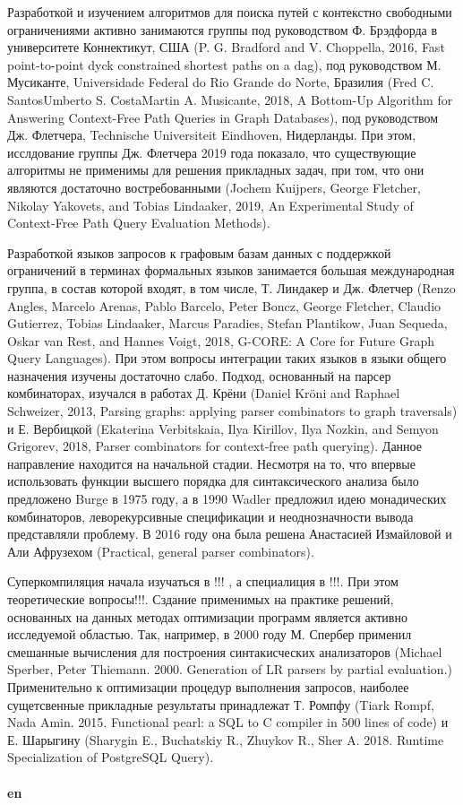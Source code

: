 \documentclass[12pt]{article}  %
\theoremstyle{remark}
\begin{document}
Разработкой и изучением алгоритмов для поиска путей с контекстно свободными ограничениями активно занимаются группы под руководством Ф. Брэдфорда в университете Коннектикут, США (P. G. Bradford and V. Choppella, 2016, Fast point-to-point dyck constrained shortest paths on a dag), под руководством М. Мусиканте, Universidade Federal do Rio Grande do Norte, Бразилия (Fred C. SantosUmberto S. CostaMartin A. Musicante, 2018, A Bottom-Up Algorithm for Answering Context-Free Path Queries in Graph Databases), под руководством Дж. Флетчера, Technische Universiteit Eindhoven, Нидерланды. При этом, исслдование группы Дж. Флетчера 2019 года показало, что существующие алгоритмы не применимы для решения прикладных задач, при том, что они являются достаточно востребованными (Jochem Kuijpers, George Fletcher, Nikolay Yakovets, and Tobias Lindaaker, 2019, An Experimental Study of Context-Free Path Query Evaluation Methods).

Разработкой языков запросов к графовым базам данных с поддержкой ограничений в терминах формальных языков занимается большая международная группа, в состав которой входят, в том числе, Т. Линдакер и Дж. Флетчер (Renzo Angles, Marcelo Arenas, Pablo Barcelo, Peter Boncz, George Fletcher, Claudio Gutierrez, Tobias Lindaaker, Marcus Paradies, Stefan Plantikow, Juan Sequeda, Oskar van Rest, and Hannes Voigt, 2018, G-CORE: A Core for Future Graph Query Languages). При этом вопросы интеграции таких языков в языки общего назначения изучены достаточно слабо. Подход, основанный на парсер комбинаторах, изучался в работах Д. Крёни (Daniel Kröni and Raphael Schweizer, 2013, Parsing graphs: applying parser combinators to graph traversals) и Е. Вербицкой (Ekaterina Verbitskaia, Ilya Kirillov, Ilya Nozkin, and Semyon Grigorev, 2018, Parser combinators for context-free path querying). Данное направление находится на начальной стадии.
Несмотря на то, что впервые использовать функции высшего порядка для синтаксического анализа было предложено Burge в 1975 году, а в 1990 Wadler предложил идею монадических комбинаторов, леворекурсивные спецификации и неоднозначности вывода представляли проблему.
В 2016 году она была решена Анастасией Измайловой и Али Афрузехом (Practical, general parser combinators).

Суперкомпиляция начала изучаться в !!! , а специалиция в !!!. При этом теоретические вопросы!!!. Сздание применимых на практике решений, основанных на данных методах оптимизации программ является активно исследуемой областью. Так, например, в 2000 году М. Спербер применил смешанные вычисления для построения синтакисческих анализаторов (Michael Sperber, Peter Thiemann. 2000. Generation of LR parsers by partial evaluation.) Применительно к оптимизации процедур выполнения запросов, наиболее сущетсвенные прикладные результаты принадлежат Т. Ромпфу (Tiark Rompf, Nada Amin. 2015. Functional pearl: a SQL to C compiler in 500 lines of code) и Е. Шарыгину (Sharygin E., Buchatskiy R., Zhuykov R., Sher A. 2018. Runtime Specialization of PostgreSQL Query).
\\
\\
\textbf{en}\\
\end{document}
